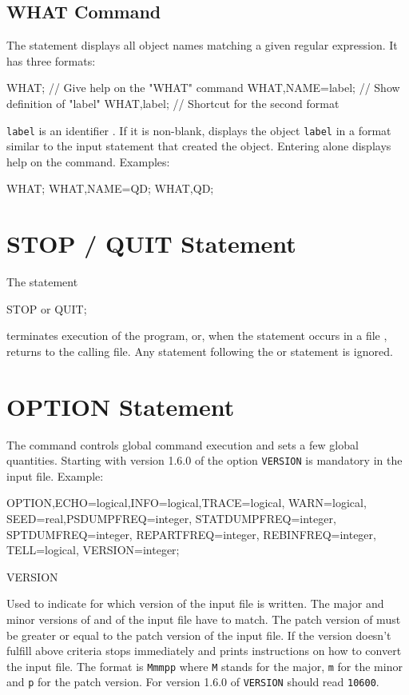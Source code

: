 \subsection{WHAT Command}
\label{sec:what}
The  statement displays all object names matching a given
regular expression.
It has three formats:
\begin{example}
WHAT;                   // Give help on the "WHAT" command
WHAT,NAME=label;        // Show definition of "label"
WHAT,label;             // Shortcut for the second format
\end{example}
\texttt{label} is an {identifier} .
If it is non-blank,
\opal displays the object \texttt{label} in a format similar to the
input statement that created the object.
Entering  alone displays help on the 
command.
\noindent Examples:
\begin{example}
WHAT;
WHAT,NAME=QD;
WHAT,QD;
\end{example}

\section{STOP / QUIT Statement}
\label{sec:stop}
The statement
\begin{example}
STOP or QUIT;
\end{example}
terminates execution of the \opal program,
or, when the statement occurs in a  file ,
returns to the calling file.
Any statement following the  or   statement is ignored.

\section{OPTION Statement}
\label{sec:option}
The  command controls global command execution and sets
a few global quantities. Starting with version 1.6.0 of \opal the option \texttt{VERSION} is
mandatory in the \opal input file. Example:
\begin{example}
OPTION,ECHO=logical,INFO=logical,TRACE=logical,
       WARN=logical,
       SEED=real,PSDUMPFREQ=integer,
       STATDUMPFREQ=integer, SPTDUMFREQ=integer,
       REPARTFREQ=integer, REBINFREQ=integer, TELL=logical, VERSION=integer;
\end{example}

\begin{kdescription}
\item[VERSION]

  Used to indicate for which version of \opal the input file is
  written. The major and minor versions of \opal and of the input file
  have to match. The patch version of \opal must be greater or equal
  to the patch version of the input file. If the version doesn't
  fulfill above criteria \opal stops immediately and prints
  instructions on how to convert the input file.  The format is
  \texttt{Mmmpp} where \texttt{M} stands for the major, \texttt{m} for
  the minor and \texttt{p} for the patch version. For version 1.6.0 of
  \opal \texttt{VERSION} should read \texttt{10600}.
\end{kdescription}

